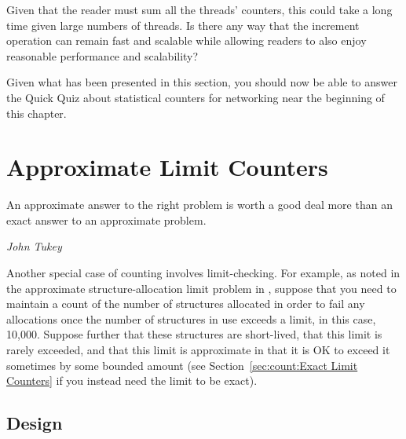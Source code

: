\QuickQuiz{}
	Given that the reader must sum all the threads' counters,
	this could take a long time given large numbers of threads.
	Is there any way that the increment operation can remain
	fast and scalable while allowing readers to also enjoy
	reasonable performance and scalability?
 \QuickQuizEnd

Given what has been presented in this section, you should now be able
to answer the Quick Quiz about statistical counters for networking
near the beginning of this chapter.

\section{Approximate Limit Counters}
\label{sec:count:Approximate Limit Counters}
%
\epigraph{An approximate answer to the right problem is worth a good deal
	  more than an exact answer to an approximate problem.}
	 {\emph{John Tukey}}

Another special case of counting involves limit-checking.
For example, as noted in the approximate structure-allocation limit
problem in \QuickQuizRef{\QcountQapproxcnt},
suppose that you need to maintain a count of the number of
structures allocated in order to fail any allocations once the number
of structures in use exceeds a limit, in this case, 10,000.
Suppose further that these structures are short-lived, that this
limit is rarely exceeded, and that this limit is approximate in
that it is OK to exceed it sometimes by some bounded amount
(see Section~\ref{sec:count:Exact Limit Counters}
if you instead need the limit to be exact).

\subsection{Design}

